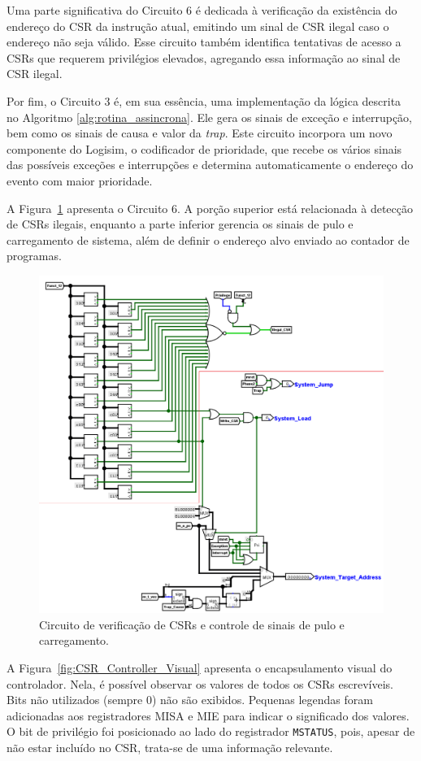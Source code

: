 \documentclass[
	12pt,				%
	openright,			%
	oneside,			%
	a4paper,			%
	english,			%
	french,				%
	spanish,			%
	brazil,				%
	]{abntex2}
\begin{document}
Uma parte significativa do Circuito 6 é dedicada à verificação da existência do endereço do CSR da instrução atual, emitindo um sinal de CSR ilegal caso o endereço não seja válido. Esse circuito também identifica tentativas de acesso a CSRs que requerem privilégios elevados, agregando essa informação ao sinal de CSR ilegal.

Por fim, o Circuito 3 é, em sua essência, uma implementação da lógica descrita no Algoritmo \ref{alg:rotina_assincrona}. Ele gera os sinais de exceção e interrupção, bem como os sinais de causa e valor da \textit{trap}. Este circuito incorpora um novo componente do Logisim, o codificador de prioridade, que recebe os vários sinais das possíveis exceções e interrupções e determina automaticamente o endereço do evento com maior prioridade.

A Figura~\ref{fig:CSR_6} apresenta o Circuito 6. A porção superior está relacionada à detecção de CSRs ilegais, enquanto a parte inferior gerencia os sinais de pulo e carregamento de sistema, além de definir o endereço alvo enviado ao contador de programas.

\begin{figure}[h]
    \centering
    \includegraphics[width=0.5\linewidth]{ProcessoDesenvolvimento/Arquitetura/CSR_6.png}
    \caption{Circuito de verificação de CSRs e controle de sinais de pulo e carregamento.}
    \label{fig:CSR_6}
\end{figure}

A Figura~\ref{fig:CSR_Controller_Visual} apresenta o encapsulamento visual do controlador. Nela, é possível observar os valores de todos os CSRs escrevíveis. Bits não utilizados (sempre 0) não são exibidos. Pequenas legendas foram adicionadas aos registradores MISA e MIE para indicar o significado dos valores. O bit de privilégio foi posicionado ao lado do registrador \texttt{MSTATUS}, pois, apesar de não estar incluído no CSR, trata-se de uma informação relevante.
\end{document}
